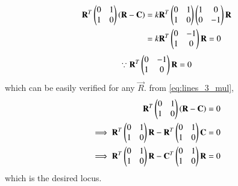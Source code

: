 \documentclass[journal,12pt,twocolumn]{IEEEtran}
\begin{document}
\begin{enumerate}[label=\arabic*]
\begin{align}
\mathbf{R}^T\begin{pmatrix}0 & 1 \\ 1 & 0\end{pmatrix}\left(\mathbf{R} - \mathbf{C}\right) &= k\mathbf{R}^T\begin{pmatrix}0 & 1 \\ 1 & 0\end{pmatrix}\begin{pmatrix}1 & 0 \\ 0 & -1\end{pmatrix}\mathbf{R}
\nonumber \\
&= k\mathbf{R}^T\begin{pmatrix}0 & -1 \\ 1 & 0\end{pmatrix}\mathbf{R} = 0
\label{eq:lines_3_mul}
\end{align}
\begin{align}
\because \mathbf{R}^T\begin{pmatrix}0 & -1 \\ 1 & 0\end{pmatrix}\mathbf{R} = 0
\end{align}
which can be easily verified for any $\vec{R}$.
%
from \eqref{eq:lines_3_mul},
\begin{align}
\mathbf{R}^T\begin{pmatrix}0 & 1 \\ 1 & 0\end{pmatrix}\left(\mathbf{R} - \mathbf{C}\right) = 0
\nonumber \\
\implies \mathbf{R}^T\begin{pmatrix}0 & 1 \\ 1 & 0\end{pmatrix}\mathbf{R} - \mathbf{R}^T\begin{pmatrix}0 & 1 \\ 1 & 0\end{pmatrix}\mathbf{C} = 0
\nonumber \\
\implies \mathbf{R}^T\begin{pmatrix}0 & 1 \\ 1 & 0\end{pmatrix}\mathbf{R} - \mathbf{C}^T\begin{pmatrix}0 & 1 \\ 1 & 0\end{pmatrix}\mathbf{R} = 0
\end{align}
%
which is the desired locus.



\end{enumerate}
\end{document}
